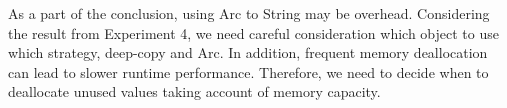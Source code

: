 As a part of the conclusion, using Arc to String may be overhead. Considering the result from Experiment 4, we need careful consideration which object to use which strategy, deep-copy and Arc.
In addition, frequent memory deallocation can lead to slower runtime performance. 
Therefore, we need to decide when to deallocate unused values taking account of memory capacity. 
